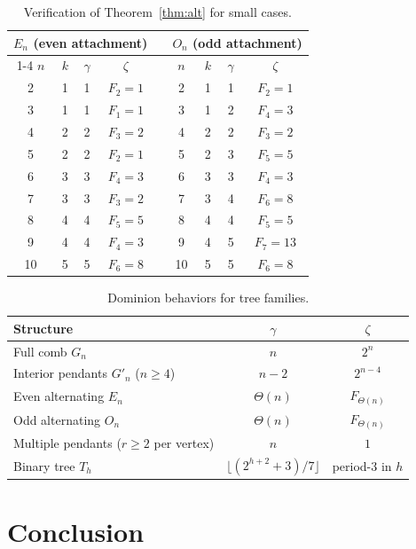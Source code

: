 \documentclass[11pt]{article}
\theoremstyle{definition}
\theoremstyle{remark}
\newcommand{\gam}{\gamma}
\newcommand{\zet}{\zeta}
\begin{document}
\begin{table}[ht]
\centering
\caption{Verification of Theorem~\ref{thm:alt} for small cases.}
\label{tab:verification}
\vspace{.1in}
\begin{tabular}{ccccccccc}
\toprule
\multicolumn{4}{c}{$E_n$ (even attachment)} & & \multicolumn{4}{c}{$O_n$ (odd attachment)} \\
\cmidrule{1-4} \cmidrule{6-9}
$n$ & $k$ & $\gam$ & $\zet$ & & $n$ & $k$ & $\gam$ & $\zet$ \\
\midrule
2 & 1 & 1 & $F_2=1$ & & 2 & 1 & 1 & $F_2=1$ \\
3 & 1 & 1 & $F_1=1$ & & 3 & 1 & 2 & $F_4=3$ \\
4 & 2 & 2 & $F_3=2$ & & 4 & 2 & 2 & $F_3=2$ \\
5 & 2 & 2 & $F_2=1$ & & 5 & 2 & 3 & $F_5=5$ \\
6 & 3 & 3 & $F_4=3$ & & 6 & 3 & 3 & $F_4=3$ \\
7 & 3 & 3 & $F_3=2$ & & 7 & 3 & 4 & $F_6=8$ \\
8 & 4 & 4 & $F_5=5$ & & 8 & 4 & 4 & $F_5=5$ \\
9 & 4 & 4 & $F_4=3$ & & 9 & 4 & 5 & $F_7=13$ \\
10 & 5 & 5 & $F_6=8$ & & 10 & 5 & 5 & $F_6=8$ \\
\bottomrule
\end{tabular}
\end{table}

\begin{table}[ht]
\centering
\caption{Dominion behaviors for tree families.}
\label{tab:summary}
\vspace{.1in}
\begin{tabular}{lcc}
\toprule
Structure & $\gam$ & $\zet$ \\
\midrule
Full comb $G_n$ & $n$ & $2^n$ \\
Interior pendants $G'_n$ ($n\ge4$) & $n-2$ & $2^{n-4}$ \\
Even alternating $E_n$ & $\Theta(n)$ & $F_{\Theta(n)}$ \\
Odd alternating $O_n$ & $\Theta(n)$ & $F_{\Theta(n)}$ \\
Multiple pendants ($r\ge2$ per vertex) & $n$ & $1$ \\
Binary tree $T_h$ & $\lfloor(2^{h+2}+3)/7\rfloor$ & period-$3$ in $h$ \\
\bottomrule
\end{tabular}
\end{table}


\section{Conclusion}
\end{document}
